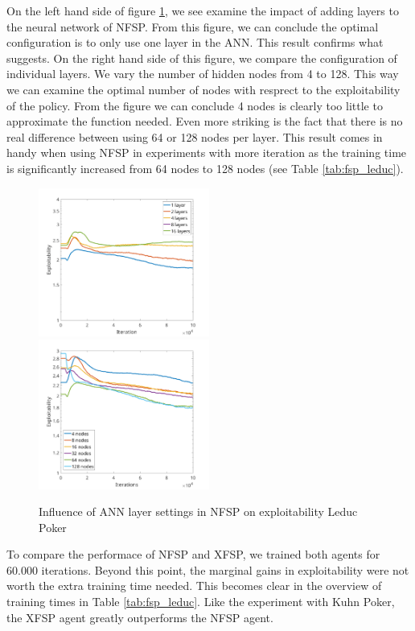 \documentclass[10pt,a4paper]{article}
\begin{document}
On the left hand side of figure \ref{fig:layers_leduc}, we see examine the impact of adding layers to the neural network of NFSP. From this figure, we can conclude the optimal configuration is to only use one layer in the ANN. This result confirms what \cite{heinrichphd} suggests.
On the right hand side of this figure, we compare the configuration of individual layers. We vary the number of hidden nodes from 4 to 128. This way we can examine the optimal number of nodes with resprect to the exploitability of the policy.
From the figure we can conclude 4 nodes is clearly too little to approximate the function needed. Even more striking is the fact that there is no real difference between using 64 or 128 nodes per layer. This result comes in handy when using NFSP in experiments with more iteration as the training time is significantly increased from 64 nodes to 128 nodes (see Table \ref{tab:fsp_leduc}).

\begin{center}
\begin{figure}[h]
\label{fig:layers_leduc}
\includegraphics[width=0.5\textwidth]{Figures/leduc_layers.png}
\includegraphics[width=0.5\textwidth]{Figures/leduc_nodes.png}
\caption{Influence of ANN layer settings in NFSP on exploitability Leduc Poker}
\end{figure}
\end{center}

To compare the performace of NFSP and XFSP, we trained both agents for 60.000 iterations. Beyond this point, the marginal gains in exploitability were not worth the extra training time needed. This becomes clear in the overview of training times in Table \ref{tab:fsp_leduc}. Like the experiment with Kuhn Poker, the XFSP agent greatly outperforms the NFSP agent. 
\end{document}
